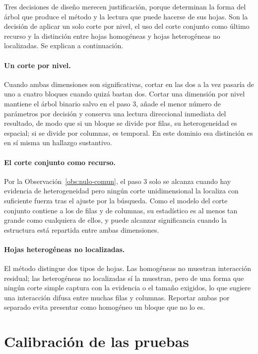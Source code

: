 Tres decisiones de diseño merecen justificación, porque determinan la forma del
árbol que produce el método y la lectura que puede hacerse de sus hojas. Son la
decisión de aplicar un solo corte por nivel, el uso del corte conjunto como
último recurso y la distinción entre hojas homogéneas y hojas heterogéneas no
localizadas. Se explican a continuación.

\paragraph{Un corte por nivel.} Cuando ambas dimensiones son significativas,
cortar en las dos a la vez pasaría de uno a cuatro bloques cuando quizá bastan
dos. Cortar una dimensión por nivel mantiene el árbol binario salvo en el paso
3, añade el menor número de parámetros por decisión y conserva una lectura
direccional inmediata del resultado, de modo que si un bloque se divide por filas, su
heterogeneidad es espacial; si se divide por columnas, es temporal. En este
dominio esa distinción es en sí misma un hallazgo sustantivo.

\paragraph{El corte conjunto como recurso.} Por la
Observación~\ref{obs:nulo-comun}, el paso 3 solo se alcanza cuando hay
evidencia de heterogeneidad pero ningún corte unidimensional la localiza con
suficiente fuerza tras el ajuste por la búsqueda. Como el modelo del corte
conjunto contiene a los de filas y de columnas, su estadístico es al menos tan
grande como cualquiera de ellos, y puede alcanzar significancia cuando la
estructura está repartida entre ambas dimensiones.

\paragraph{Hojas heterogéneas no localizadas.} El método distingue dos tipos
de hojas. Las homogéneas no muestran interacción residual; las heterogéneas no
localizadas sí la muestran, pero de una forma que ningún corte simple captura
con la evidencia o el tamaño exigidos, lo que sugiere una interacción difusa
entre muchas filas y columnas. Reportar ambas por separado evita presentar como
homogéneo un bloque que no lo es.

\section{Calibración de las pruebas}\label{sec:prop-calibracion}


